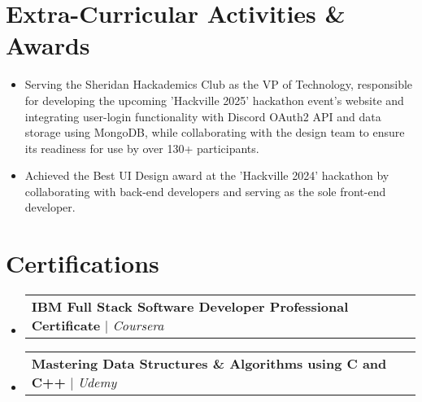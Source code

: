 \documentclass[a4,11pt]{article}
\makeatletter
\newcommand{\resumeItem}[1]{
  \item\small{
    {#1 \vspace{-2pt}}
  }
}
\newcommand{\resumeProjectHeading}[2]{
    \item
    \begin{tabular*}{1.001\textwidth}{l@{\extracolsep{\fill}}r}
      \small#1 & \textbf{\small #2}\\
    \end{tabular*}\vspace{-6pt}
}
\newcommand{\resumeSubHeadingListStart}{\begin{itemize}[leftmargin=0.0in, label={}]}
\newcommand{\resumeSubHeadingListEnd}{\end{itemize}}
\newcommand{\resumeItemListStart}{\begin{itemize}}
\newcommand{\resumeItemListEnd}{\end{itemize}\vspace{-5pt}}
\makeatother
\begin{document}
\section{Extra-Curricular Activities \& Awards}
       \resumeSubHeadingListStart
        \resumeItemListStart
            \resumeItem{Serving the Sheridan Hackademics Club as the VP of Technology, responsible for developing the upcoming 'Hackville 2025' hackathon event's website and integrating user-login functionality with Discord OAuth2 API and data storage using MongoDB, while collaborating with the design team to ensure its readiness for use by over 130+ participants.}
            \vspace{2pt}
            \resumeItem{Achieved the Best UI Design award at the 'Hackville 2024' hackathon by collaborating with back-end developers and serving as the sole front-end developer.}
        \resumeItemListEnd
    \resumeSubHeadingListEnd
\vspace{-15pt}

\section{Certifications}
    \resumeSubHeadingListStart
        \resumeProjectHeading
          {\textbf{IBM Full Stack Software Developer Professional Certificate} $|$ \emph{Coursera}}{}
          \vspace{-24pt}
        \resumeProjectHeading
          {\textbf{Mastering Data Structures \& Algorithms using C and C++} $|$ \emph{Udemy}}{}
          \vspace{-15pt}
    \resumeSubHeadingListEnd
\end{document}

